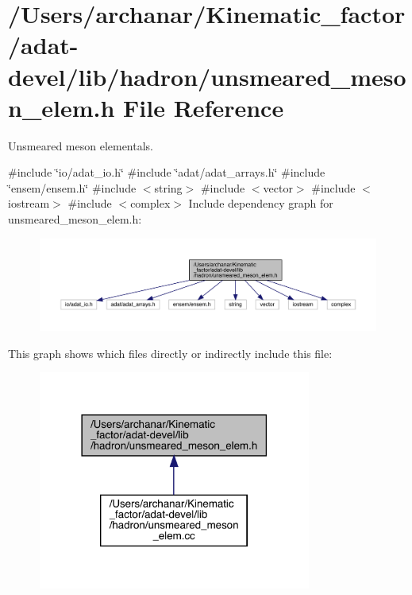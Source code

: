 \hypertarget{adat-devel_2lib_2hadron_2unsmeared__meson__elem_8h}{}\section{/\+Users/archanar/\+Kinematic\+\_\+factor/adat-\/devel/lib/hadron/unsmeared\+\_\+meson\+\_\+elem.h File Reference}
\label{adat-devel_2lib_2hadron_2unsmeared__meson__elem_8h}


Unsmeared meson elementals.  


{\ttfamily \#include \char`\"{}io/adat\+\_\+io.\+h\char`\"{}}\newline
{\ttfamily \#include \char`\"{}adat/adat\+\_\+arrays.\+h\char`\"{}}\newline
{\ttfamily \#include \char`\"{}ensem/ensem.\+h\char`\"{}}\newline
{\ttfamily \#include $<$string$>$}\newline
{\ttfamily \#include $<$vector$>$}\newline
{\ttfamily \#include $<$iostream$>$}\newline
{\ttfamily \#include $<$complex$>$}\newline
Include dependency graph for unsmeared\+\_\+meson\+\_\+elem.\+h\+:
\nopagebreak
\begin{figure}[H]
\begin{center}
\leavevmode
\includegraphics[width=350pt]{da/d2a/adat-devel_2lib_2hadron_2unsmeared__meson__elem_8h__incl}
\end{center}
\end{figure}
This graph shows which files directly or indirectly include this file\+:
\nopagebreak
\begin{figure}[H]
\begin{center}
\leavevmode
\includegraphics[width=254pt]{df/d7e/adat-devel_2lib_2hadron_2unsmeared__meson__elem_8h__dep__incl}
\end{center}
\end{figure}
